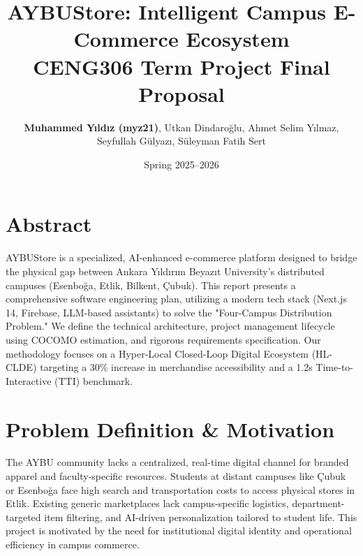 \documentclass[11pt,a4paper]{article}
\title{\LARGE \textbf{AYBUStore: Intelligent Campus E-Commerce Ecosystem}\\[0.5em] \large \textbf{CENG306 Term Project Final Proposal}}
\author{\textbf{Muhammed Yıldız (myz21)}, Utkan Dindaroğlu, Ahmet Selim Yılmaz, \\ Seyfullah Gülyazı, Süleyman Fatih Sert}
\date{Spring 2025--2026}
\begin{document}
\maketitle

\section{Abstract}
AYBUStore is a specialized, AI-enhanced e-commerce platform designed to bridge the physical gap between Ankara Yıldırım Beyazıt University's distributed campuses (Esenboğa, Etlik, Bilkent, Çubuk). This report presents a comprehensive software engineering plan, utilizing a modern tech stack (Next.js 14, Firebase, LLM-based assistants) to solve the "Four-Campus Distribution Problem." We define the technical architecture, project management lifecycle using COCOMO estimation, and rigorous requirements specification. Our methodology focuses on a Hyper-Local Closed-Loop Digital Ecosystem (HL-CLDE) targeting a 30\% increase in merchandise accessibility and a 1.2s Time-to-Interactive (TTI) benchmark.

\section{Problem Definition \& Motivation}
The AYBU community lacks a centralized, real-time digital channel for branded apparel and faculty-specific resources. Students at distant campuses like Çubuk or Esenboğa face high search and transportation costs to access physical stores in Etlik. Existing generic marketplaces lack campus-specific logistics, department-targeted item filtering, and AI-driven personalization tailored to student life. This project is motivated by the need for institutional digital identity and operational efficiency in campus commerce.
\end{document}
